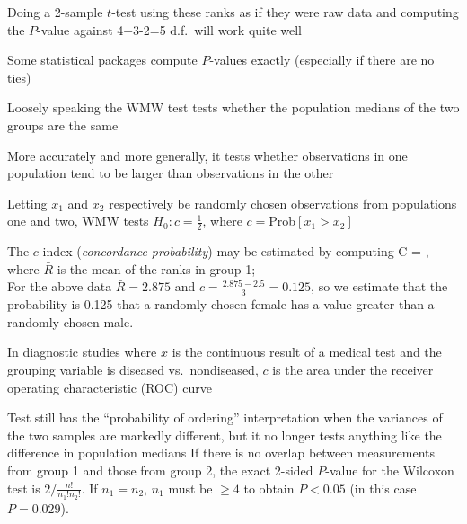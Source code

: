\item Doing a 2-sample $t$-test using these ranks as if they were raw
  data and computing the $P$-value against 4+3-2=5 d.f.\ will work
  quite well
\item Some statistical packages compute $P$-values exactly (especially
  if there are no ties)
\item Loosely speaking the WMW test tests whether the population
  medians of the two groups are the same
\item More accurately and more generally, it tests whether
  observations in one population tend to be larger than observations
  in the other
\item Letting $x_1$ and $x_2$ respectively be randomly chosen
  observations from populations one and two, WMW tests
  $H_{0}:c=\frac{1}{2}$, where $c=$Prob$[x_{1} > x_{2}]$
\item The $c$ index (\emph{concordance probability}) may be estimated
  by computing
\beq
C = ,
\eeq
where $\bar{R}$ is the mean of the ranks in group 1; \\
For the above data $\bar{R} = 2.875$ and
$c=\frac{2.875-2.5}{3}=0.125$, so we estimate that the probability is
0.125 that a randomly chosen female has a value greater than a randomly
chosen male.
\item In diagnostic studies where $x$ is the continuous result of a
  medical test and the grouping variable is diseased vs.\ nondiseased,
  $c$ is the area under the receiver operating characteristic (ROC) curve
\item Test still has the ``probability of ordering'' interpretation
  when the variances of the two samples are markedly different, but it
  no longer tests anything like the difference in population medians
\ei
If there is no overlap between measurements from group 1 and those
from group 2, the exact 2-sided $P$-value for the Wilcoxon test is $2
/ \frac{n!}{n_{1}! n_{2}!}$.  If $n_{1}=n_{2}$, $n_{1}$ must be $\geq
4$ to obtain $P < 0.05$ (in this case $P = 0.029$). 

